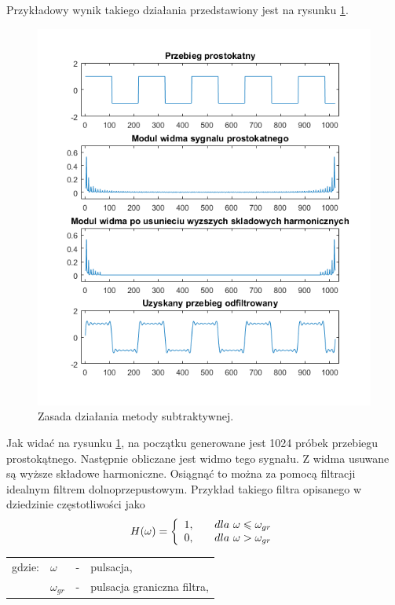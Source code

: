 Przykładowy wynik takiego działania przedstawiony jest na rysunku \ref{rys:sub_wykres1}.
\begin{figure}[H]
	\centering
	\includegraphics[width=12cm]{grafiki/sub_wykres1}
	\captionsetup{justification=centering}
	\caption{Zasada działania metody subtraktywnej.}
	\label{rys:sub_wykres1}
\end{figure}
Jak widać na rysunku \ref{rys:sub_wykres1}, na początku generowane jest 1024 próbek przebiegu prostokątnego. Następnie obliczane jest widmo tego sygnału. Z widma usuwane są wyższe składowe harmoniczne. Osiągnąć to można za pomocą filtracji idealnym filtrem dolnoprzepustowym. Przykład takiego filtra opisanego w dziedzinie częstotliwości jako
\begin{equation} \label{equ:sub_lowpass}
H(\omega)=\left \{\begin{array}{ r l }
1, & \quad \text{$dla$ } \omega \leqslant \omega_{gr}\\
0, & \quad  \text{$dla$ } \omega > \omega_{gr}
\end{array}
\right.
\end{equation}
\begin{tabular}{ l l l l}
	gdzie: & $\omega$ &  - & pulsacja, \\
	&	$\omega_{gr}$ & - &  pulsacja graniczna filtra,\\
\end{tabular} \\ \\
